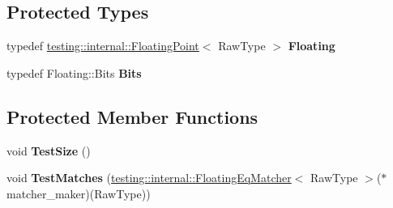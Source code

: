 \subsection*{Protected Types}
\begin{DoxyCompactItemize}
\item 
\mbox{\label{classtesting_1_1gmock__matchers__test_1_1_floating_point_test_ae1459f93e1b18426625daf4fa98e80c6}} 
typedef \hyperlink{classtesting_1_1internal_1_1_floating_point}{testing\+::internal\+::\+Floating\+Point}$<$ Raw\+Type $>$ {\bfseries Floating}
\item 
\mbox{\label{classtesting_1_1gmock__matchers__test_1_1_floating_point_test_addf899bd832ae51103198d201d2f2ea2}} 
typedef Floating\+::\+Bits {\bfseries Bits}
\end{DoxyCompactItemize}
\subsection*{Protected Member Functions}
\begin{DoxyCompactItemize}
\item 
\mbox{\label{classtesting_1_1gmock__matchers__test_1_1_floating_point_test_ad6f8f0f5c939b7447a5717620b728018}} 
void {\bfseries Test\+Size} ()
\item 
\mbox{\label{classtesting_1_1gmock__matchers__test_1_1_floating_point_test_a69d14d66bbd82f6b8bbe985046b59538}} 
void {\bfseries Test\+Matches} (\hyperlink{classtesting_1_1internal_1_1_floating_eq_matcher}{testing\+::internal\+::\+Floating\+Eq\+Matcher}$<$ Raw\+Type $>$($\ast$matcher\+\_\+maker)(Raw\+Type))
\end{DoxyCompactItemize}
